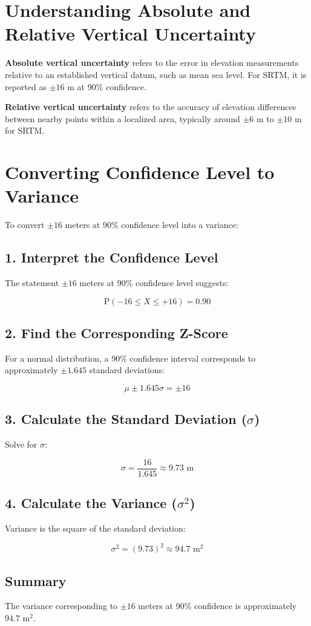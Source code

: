 \documentclass{article}
\begin{document}
\section{Understanding Absolute and Relative Vertical Uncertainty}
\textbf{Absolute vertical uncertainty} refers to the error in elevation measurements relative to an established vertical datum, such as mean sea level. For SRTM, it is reported as $\pm 16$ m at 90\% confidence.

\textbf{Relative vertical uncertainty} refers to the accuracy of elevation differences between nearby points within a localized area, typically around $\pm 6$ m to $\pm 10$ m for SRTM.

\section{Converting Confidence Level to Variance}
To convert $\pm 16$ meters at 90\% confidence level into a variance:

\subsection{1. Interpret the Confidence Level}
The statement $\pm 16$ meters at 90\% confidence level suggests:

\[
\text{P}(-16 \leq X \leq +16) = 0.90
\]

\subsection{2. Find the Corresponding Z-Score}
For a normal distribution, a 90\% confidence interval corresponds to approximately $\pm 1.645$ standard deviations:

\[
\mu \pm 1.645\sigma = \pm 16
\]

\subsection{3. Calculate the Standard Deviation ($\sigma$)}
Solve for $\sigma$:

\[
\sigma = \frac{16}{1.645} \approx 9.73 \text{ m}
\]

\subsection{4. Calculate the Variance ($\sigma^2$)}
Variance is the square of the standard deviation:

\[
\sigma^2 = (9.73)^2 \approx 94.7 \text{ m}^2
\]

\subsection{Summary}
The variance corresponding to $\pm 16$ meters at 90\% confidence is approximately $94.7 \text{ m}^2$.
\end{document}
